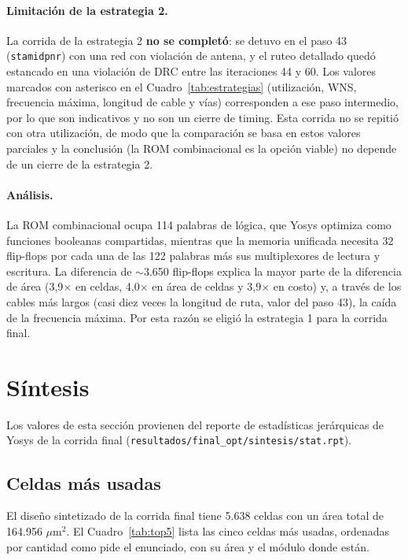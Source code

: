 \documentclass[11pt,letterpaper]{article}
\newcommand{\code}[1]{\texttt{#1}}
\begin{document}
\paragraph{Limitación de la estrategia 2.} La corrida de la estrategia 2 \textbf{no se completó}: se detuvo en el paso 43 (\code{stamidpnr}) con una red con violación de antena, y el ruteo detallado quedó estancado en una violación de DRC entre las iteraciones 44 y 60. Los valores marcados con asterisco en el Cuadro~\ref{tab:estrategias} (utilización, WNS, frecuencia máxima, longitud de cable y vías) corresponden a ese paso intermedio, por lo que son indicativos y no son un cierre de timing. Esta corrida no se repitió con otra utilización, de modo que la comparación se basa en estos valores parciales y la conclusión (la ROM combinacional es la opción viable) no depende de un cierre de la estrategia 2.

\paragraph{Análisis.} La ROM combinacional ocupa 114 palabras de lógica, que Yosys optimiza como funciones booleanas compartidas, mientras que la memoria unificada necesita 32 flip-flops por cada una de las 122 palabras más sus multiplexores de lectura y escritura. La diferencia de $\sim$3.650 flip-flops explica la mayor parte de la diferencia de área (3,9$\times$ en celdas, 4,0$\times$ en área de celdas y 3,9$\times$ en costo) y, a través de los cables más largos (casi diez veces la longitud de ruta, valor del paso 43), la caída de la frecuencia máxima. Por esta razón se eligió la estrategia 1 para la corrida final.

\section{Síntesis}
\label{sec:sint}

Los valores de esta sección provienen del reporte de estadísticas jerárquicas de Yosys de la corrida final (\code{resultados/final\_opt/}\allowbreak\code{sintesis/stat.rpt}).

\subsection{Celdas más usadas}

El diseño sintetizado de la corrida final tiene 5.638 celdas con un área total de 164.956 $\mu$m$^2$. El Cuadro~\ref{tab:top5} lista las cinco celdas más usadas, ordenadas por cantidad como pide el enunciado, con su área y el módulo donde están.
\end{document}
